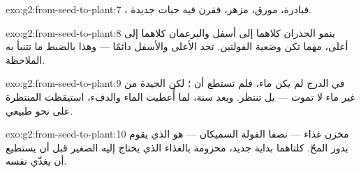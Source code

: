 \begin{solution}{exo:g2:from-seed-to-plant:7}
، فبادرة،  مورق،  مزهر، فقرن فيه حبات جديدة.
\end{solution}

\begin{solution}{exo:g2:from-seed-to-plant:8}
ينمو الجذران كلاهما إلى أسفل والبرعمان كلاهما إلى أعلى، مهما تكن
وضعية الفولتين.  تجد الأعلى والأسفل دائمًا --- وهذا بالضبط
ما تتنبأ به الملاحظة.
\end{solution}

\begin{solution}{exo:g2:from-seed-to-plant:9}
في الدرج لم يكن  ماء، فلم تستطع أن ؛ لكن  الجيدة
من غير ماء لا تموت --- بل تنتظر. وبعد سنة، لما أُعطيت الماء
والدفء، استيقظت  المنتظرة على نحو طبيعي.
\end{solution}

\begin{solution}{exo:g2:from-seed-to-plant:10}
مخزن غذاء  --- نصفا الفولة السميكان --- هو الذي يقوم بدور
المحّ.   كلتاهما بداية  جديد، محزومة بالغذاء
الذي يحتاج إليه الصغير قبل أن يستطيع أن يغذّي نفسه.
\end{solution}
